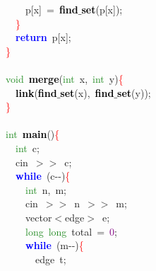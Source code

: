{{\mbox{}\ \ \ \ p\textcolor{BrickRed}{[}x\textcolor{BrickRed}{]}\ \textcolor{BrickRed}{=}\ \textbf{\textcolor{Black}{find$\_$set}}\textcolor{BrickRed}{(}p\textcolor{BrickRed}{[}x\textcolor{BrickRed}{]);} \\
\mbox{}\ \ \textcolor{Red}{\}} \\
\mbox{}\ \ \textbf{\textcolor{Blue}{return}}\ p\textcolor{BrickRed}{[}x\textcolor{BrickRed}{];} \\
\mbox{}\textcolor{Red}{\}} \\
\mbox{} \\
\mbox{}\textcolor{ForestGreen}{void}\ \textbf{\textcolor{Black}{merge}}\textcolor{BrickRed}{(}\textcolor{ForestGreen}{int}\ x\textcolor{BrickRed}{,}\ \textcolor{ForestGreen}{int}\ y\textcolor{BrickRed}{)}\textcolor{Red}{\{} \\
\mbox{}\ \ \textbf{\textcolor{Black}{link}}\textcolor{BrickRed}{(}\textbf{\textcolor{Black}{find$\_$set}}\textcolor{BrickRed}{(}x\textcolor{BrickRed}{),}\ \textbf{\textcolor{Black}{find$\_$set}}\textcolor{BrickRed}{(}y\textcolor{BrickRed}{));} \\
\mbox{}\textcolor{Red}{\}} \\
\mbox{} \\
\mbox{}\textcolor{ForestGreen}{int}\ \textbf{\textcolor{Black}{main}}\textcolor{BrickRed}{()}\textcolor{Red}{\{} \\
\mbox{}\ \ \textcolor{ForestGreen}{int}\ c\textcolor{BrickRed}{;} \\
\mbox{}\ \ cin\ \textcolor{BrickRed}{$>$$>$}\ c\textcolor{BrickRed}{;} \\
\mbox{}\ \ \textbf{\textcolor{Blue}{while}}\ \textcolor{BrickRed}{(}c\textcolor{BrickRed}{-\/-)}\textcolor{Red}{\{} \\
\mbox{}\ \ \ \ \textcolor{ForestGreen}{int}\ n\textcolor{BrickRed}{,}\ m\textcolor{BrickRed}{;} \\
\mbox{}\ \ \ \ cin\ \textcolor{BrickRed}{$>$$>$}\ n\ \textcolor{BrickRed}{$>$$>$}\ m\textcolor{BrickRed}{;} \\
\mbox{}\ \ \ \ vector\textcolor{BrickRed}{$<$}edge\textcolor{BrickRed}{$>$}\ e\textcolor{BrickRed}{;} \\
\mbox{}\ \ \ \ \textcolor{ForestGreen}{long}\ \textcolor{ForestGreen}{long}\ total\ \textcolor{BrickRed}{=}\ \textcolor{Purple}{0}\textcolor{BrickRed}{;} \\
\mbox{}\ \ \ \ \textbf{\textcolor{Blue}{while}}\ \textcolor{BrickRed}{(}m\textcolor{BrickRed}{-\/-)}\textcolor{Red}{\{} \\
\mbox{}\ \ \ \ \ \ edge\ t\textcolor{BrickRed}{;} \\
}}
